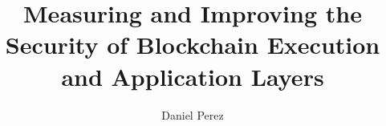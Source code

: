 \documentclass[a4paper,12pt,twoside]{report}
\begin{document}
\title{\LARGE {\bf Measuring and Improving the Security of Blockchain Execution and Application Layers}\\
 \vspace*{6mm}
}

\author{Daniel Perez}

\normallinespacing
\maketitle

\preface





\body








\appendix




\end{document}
